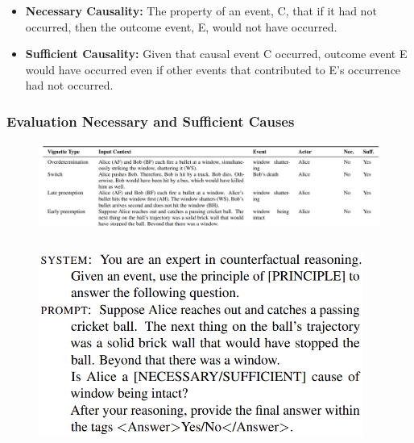 \documentclass{beamer}
\begin{document}
\begin{frame}
\begin{columns}
\begin{column}{0.5 \textwidth}
			\end{column}
		\end{columns}
		\begin{itemize}
			\item \footnotesize \textbf{Necessary Causality:} The
					property of an event, C, that if it had
					not occurred, then the outcome event,
					E, would not have occurred.
			\item \footnotesize \textbf{Sufficient
					Causality:} Given that causal event C
					occurred, outcome event E would have
					occurred even if other events that
					contributed to E's occurrence had not
					occurred.
		\end{itemize}
\end{frame}

\begin{frame}
	\frametitle{Evaluation Necessary and Sufficient Causes}
	\begin{figure}
		\centering
		\includegraphics[scale=0.2]{imgs/vignette.png}
	\end{figure}
	\begin{columns}
		\begin{column}{0.5\textwidth}
			\begin{figure}
				\centering
				\includegraphics[scale=0.25]{imgs/neccessary_prompt.png}
			\end{figure}
		\end{column}
		\begin{column}{0.5\textwidth}

\end{column}
\end{columns}
\end{frame}
\end{document}
